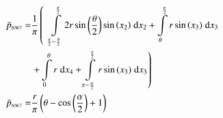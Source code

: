 \begin{align}
    \bar{p}_{\text{\tiny{NW7}}} =&\frac{1}{\pi} \left(\;\;\int\limits_{\frac{\pi}{2} - \frac{\theta}{2}}^{\frac{\pi}{2}}2 r \sin{\left (\frac{\theta}{2} \right )} \sin{\left (x_{2} \right )}\;\mathrm{d}x_{2}+\int\limits_{\theta}^{\frac{\pi}{2}}r \sin{\left (x_{3} \right )}\;\mathrm{d}x_{3}\right.\notag\\
 &\left.+\int\limits_{0}^{\theta}r\;\mathrm{d}x_{4}+\int\limits_{\pi - \frac{\alpha}{2}}^{\frac{\pi}{2}}r \sin{\left (x_{3} \right )}\;\mathrm{d}x_{3}\right)\label{pNW7Def}\\
    \bar{p}_{\text{\tiny{NW7}}}  =& \frac{r}{\pi} \left(\theta - \cos{\left (\frac{\alpha}{2} \right )} + 1\right)\label{pNW7Sln}
\end{align}